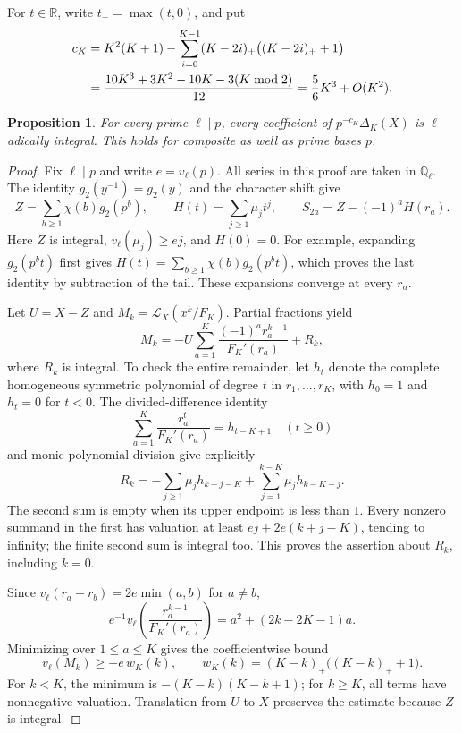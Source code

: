 \documentclass[11pt,letterpaper]{article}
\numberwithin{equation}{section}
\newtheorem{proposition}[theorem]{Proposition}
\theoremstyle{remark}\newtheorem{remark}[theorem]{Remark}
\newcommand{\Q}{\mathbb Q}\newcommand{\Z}{\mathbb Z}\newcommand{\C}{\mathbb C}
\newcommand{\Lcal}{\mathcal L}\newcommand{\Fcal}{\mathcal F}
\begin{document}
For $t\in\mathbb R$, write $t_+=\max(t,0)$, and put
\begin{align}\label{eq:cK}
 c_K&=K^2(K+1)-\sum_{i=0}^{K-1}(K-2i)_+\bigl((K-2i)_++1\bigr)\notag\\
 &=\frac{10K^3+3K^2-10K-3(K\bmod2)}{12}
 =\frac56K^3+O(K^2).
\end{align}
\begin{proposition}\label{prop:content}
For every prime $\ell\mid p$, every coefficient of $p^{-c_K}\Delta_K(X)$ is $\ell$-adically integral. This holds for composite as well as prime bases $p$.
\end{proposition}
\begin{proof}
Fix $\ell\mid p$ and write $e=v_\ell(p)$. All series in this proof are taken in $\Q_\ell$. The identity $g_2(y^{-1})=g_2(y)$ and the character shift give
\begin{equation}\label{eq:localseries}
 Z=\sum_{b\ge1}\chi(b)g_2(p^b),\qquad
 H(t)=\sum_{j\ge1}\mu_jt^j,\qquad
 S_{2a}=Z-(-1)^aH(r_a).
\end{equation}
Here $Z$ is integral, $v_\ell(\mu_j)\ge ej$, and $H(0)=0$. For example, expanding $g_2(p^bt)$ first gives $H(t)=\sum_{b\ge1}\chi(b)g_2(p^bt)$, which proves the last identity by subtraction of the tail. These expansions converge at every $r_a$.

Let $U=X-Z$ and $M_k=\Lcal_X(x^k/F_K)$. Partial fractions yield
\begin{equation}\label{eq:Mlocal}
 M_k=-U\sum_{a=1}^K\frac{(-1)^ar_a^{k-1}}{F_K'(r_a)}+R_k,
\end{equation}
where $R_k$ is integral. To check the entire remainder, let $h_t$ denote the complete homogeneous symmetric polynomial of degree $t$ in $r_1,\ldots,r_K$, with $h_0=1$ and $h_t=0$ for $t<0$. The divided-difference identity
\begin{equation*}
 \sum_{a=1}^K\frac{r_a^t}{F_K'(r_a)}=h_{t-K+1}\quad(t\ge0)
\end{equation*}
and monic polynomial division give explicitly
\begin{equation}\label{eq:Rlocal}
 R_k=-\sum_{j\ge1}\mu_jh_{k+j-K}
       +\sum_{j=1}^{k-K}\mu_jh_{k-K-j}.
\end{equation}
The second sum is empty when its upper endpoint is less than $1$. Every nonzero summand in the first has valuation at least $ej+2e(k+j-K)$, tending to infinity; the finite second sum is integral too. This proves the assertion about $R_k$, including $k=0$.

Since $v_\ell(r_a-r_b)=2e\min(a,b)$ for $a\ne b$,
\begin{equation*}
 e^{-1}v_\ell\left(\frac{r_a^{k-1}}{F_K'(r_a)}\right)
 =a^2+(2k-2K-1)a.
\end{equation*}
Minimizing over $1\le a\le K$ gives the coefficientwise bound
\begin{equation}\label{eq:entryvaluation}
 v_\ell(M_k)\ge-e\,w_K(k),\qquad
 w_K(k)=(K-k)_+\bigl((K-k)_++1\bigr).
\end{equation}
For $k<K$, the minimum is $-(K-k)(K-k+1)$; for $k\ge K$, all terms have nonnegative valuation. Translation from $U$ to $X$ preserves the estimate because $Z$ is integral.


\end{proof}
\end{document}
